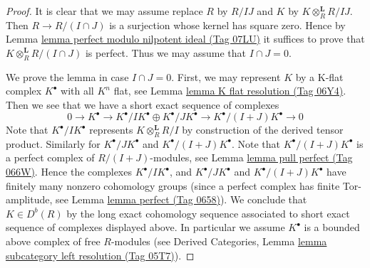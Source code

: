 \documentclass{amsart}
\theoremstyle{plain}
\theoremstyle{definition}
\theoremstyle{remark}
\numberwithin{equation}{subsection}
\begin{document}
\begin{proof}
It is clear that we may assume replace $R$ by $R/IJ$ and $K$ by
$K \otimes_R^\mathbf{L} R/IJ$. Then $R \to R/(I \cap J)$ is
a surjection whose kernel has square zero. Hence by
Lemma \href{https://stacks.math.columbia.edu/tag/07LU}{lemma perfect modulo nilpotent ideal (Tag 07LU)}
it suffices to prove that $K \otimes_R^\mathbf{L} R/(I \cap J)$ is
perfect. Thus we may assume that $I \cap J = 0$.

\medskip\noindent
We prove the lemma in case $I \cap J = 0$. First, we may represent $K$
by a K-flat complex $K^\bullet$ with all $K^n$ flat, see
Lemma \href{https://stacks.math.columbia.edu/tag/06Y4}{lemma K flat resolution (Tag 06Y4)}. Then we see that we have a short
exact sequence of complexes
$$
0 \to
K^\bullet \to K^\bullet/IK^\bullet \oplus K^\bullet/JK^\bullet \to
K^\bullet/(I + J)K^\bullet \to 0
$$
Note that $K^\bullet/IK^\bullet$ represents $K \otimes^\mathbf{L}_R R/I$
by construction of the derived tensor product. Similarly for
$K^\bullet/JK^\bullet$ and $K^\bullet/(I + J)K^\bullet$.
Note that $K^\bullet/(I + J)K^\bullet$ is a perfect complex
of $R/(I + J)$-modules, see
Lemma \href{https://stacks.math.columbia.edu/tag/066W}{lemma pull perfect (Tag 066W)}.
Hence the complexes $K^\bullet/IK^\bullet$, and
$K^\bullet/JK^\bullet$ and $K^\bullet/(I + J)K^\bullet$
have finitely many nonzero cohomology groups
(since a perfect complex has finite Tor-amplitude, see
Lemma \href{https://stacks.math.columbia.edu/tag/0658}{lemma perfect (Tag 0658)}). We conclude that $K \in D^b(R)$ by the
long exact cohomology sequence associated to short exact sequence
of complexes displayed above. In particular we assume $K^\bullet$
is a bounded above complex of free $R$-modules (see
Derived Categories, Lemma \href{https://stacks.math.columbia.edu/tag/05T7}{lemma subcategory left resolution (Tag 05T7)}).


\end{proof}
\end{document}

